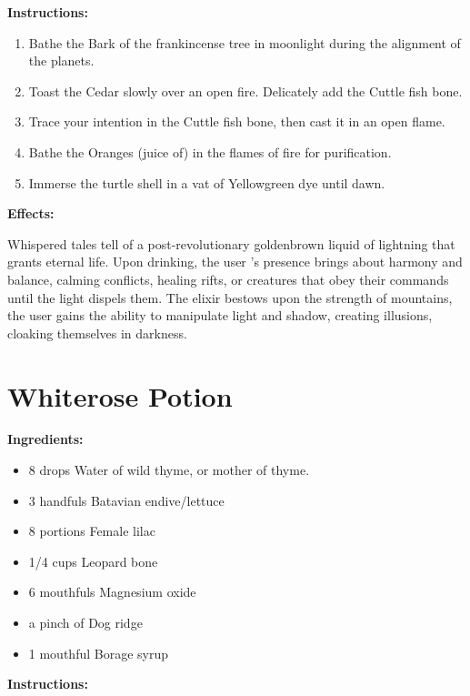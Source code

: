 \documentclass{article}
\begin{document}
\textbf{Instructions:}

\begin{enumerate}
  \item Bathe the Bark of the frankincense tree in moonlight during the alignment of the planets.
  \item Toast the Cedar slowly over an open fire. Delicately add the Cuttle fish bone.
  \item Trace your intention in the Cuttle fish bone, then cast it in an open flame.
  \item Bathe the Oranges (juice of) in the flames of fire for purification.
  \item Immerse the turtle shell in a vat of Yellowgreen dye until dawn.
\end{enumerate}

\textbf{Effects:}

Whispered tales tell of a post-revolutionary goldenbrown liquid of lightning that grants eternal life. Upon drinking, the user 's presence brings about harmony and balance, calming conflicts, healing rifts, or creatures that obey their commands until the light dispels them. The elixir bestows upon the strength of mountains, the user gains the ability to manipulate light and shadow, creating illusions, cloaking themselves in darkness.

\newpage
\section*{Whiterose Potion}

\textbf{Ingredients:}

\begin{itemize}
  \item 8 drops Water of wild thyme, or mother of thyme.
  \item 3 handfuls Batavian endive/lettuce
  \item 8 portions Female lilac
  \item 1/4 cups Leopard bone
  \item 6 mouthfuls Magnesium oxide
  \item a pinch of Dog ridge
  \item 1 mouthful Borage syrup
\end{itemize}

\textbf{Instructions:}
\end{document}
